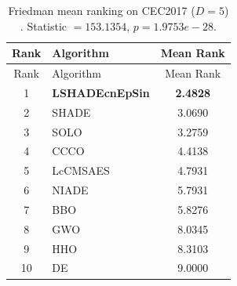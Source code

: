 \begin{center}
\small
\renewcommand{\arraystretch}{1.25}
\begin{longtable}{clc}
\caption{Friedman mean ranking on CEC2017 ($D=5$) . Statistic $=153.1354$, $p=1.9753e-28$.}
\label{tab:friedman_CEC2017_5} \\
\toprule
Rank & Algorithm & Mean Rank \\
\midrule
\endfirsthead
\toprule
Rank & Algorithm & Mean Rank \\
\midrule
\endhead
1 & \textbf{LSHADEcnEpSin} & \textbf{2.4828} \\
2 & SHADE & 3.0690 \\
3 & SOLO & 3.2759 \\
4 & CCCO & 4.4138 \\
5 & LcCMSAES & 4.7931 \\
6 & NIADE & 5.7931 \\
7 & BBO & 5.8276 \\
8 & GWO & 8.0345 \\
9 & HHO & 8.3103 \\
10 & DE & 9.0000 \\
\bottomrule
\end{longtable}
\end{center}